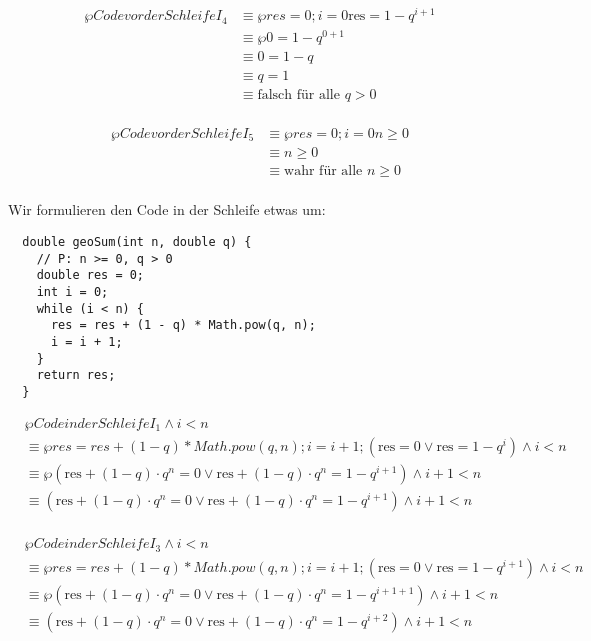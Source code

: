 \documentclass{bschlangaul-aufgabe}
\begin{document}
\begin{bAntwort}
\begin{align*}
\wp{Code vor der Schleife}{I_4}
& \equiv \wp{res = 0; i = 0}{\text{res} = 1 - q^{i+1}} \\
& \equiv \wp{}{0 = 1 - q^{0+1}} \\
& \equiv 0 = 1 - q \\
& \equiv q = 1 \\
& \equiv \text{falsch für alle } q > 0\\
\end{align*}

\begin{align*}
\wp{Code vor der Schleife}{I_5}
& \equiv \wp{res = 0; i = 0}{n \geq 0} \\
& \equiv n \geq 0 \\
& \equiv \text{wahr für alle } n \geq 0\\
\end{align*}

%


Wir formulieren den Code in der Schleife etwas um:

\begin{verbatim}
  double geoSum(int n, double q) {
    // P: n >= 0, q > 0
    double res = 0;
    int i = 0;
    while (i < n) {
      res = res + (1 - q) * Math.pow(q, n);
      i = i + 1;
    }
    return res;
  }
\end{verbatim}

\begin{align*}
&\wp{Code in der Schleife}{I_1 \land i < n}\\
&\equiv \wp{res = res + (1-q) * Math.pow(q, n); i = i + 1;}
{(\text{res} = 0 \lor \text{res} = 1 - q^i) \land i < n} \\
&\equiv \wp{}
{(\text{res} + (1-q) \cdot q^n = 0 \lor \text{res} + (1-q) \cdot q^n = 1 - q^{i + 1}) \land i + 1 < n} \\
&\equiv
(\text{res} + (1-q) \cdot q^n = 0 \lor \text{res} + (1-q) \cdot q^n = 1 - q^{i + 1}) \land i + 1 < n \\
\end{align*}

\begin{align*}
&\wp{Code in der Schleife}{I_3 \land i < n}\\
& \equiv \wp{res = res + (1-q) * Math.pow(q, n); i = i + 1;}
{(\text{res} = 0 \lor \text{res} = 1 - q^{i+1}) \land i < n} \\
& \equiv \wp{}
{(\text{res} + (1-q) \cdot q^n = 0 \lor \text{res} + (1-q) \cdot q^n  = 1 - q^{i + 1 + 1}) \land i + 1 < n} \\
& \equiv
(\text{res} + (1-q) \cdot q^n = 0 \lor \text{res} + (1-q) \cdot q^n  = 1 - q^{i + 2}) \land i + 1 < n \\
\end{align*}


\end{bAntwort}
\end{document}
